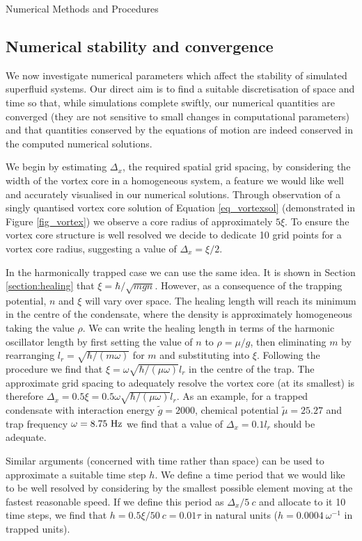 \begin{chapter}{\label{cha:numerics}Numerical Methods and Procedures}
\subsection{\label{section:numericalParams} Numerical stability and convergence}
	We now investigate numerical parameters which affect the stability of simulated superfluid systems. Our direct aim is to find a suitable discretisation of space and time so that, while simulations complete swiftly, our numerical quantities are converged (they are not sensitive to small changes in computational parameters) and that quantities conserved by the equations of motion are indeed conserved in the computed numerical solutions.

	We begin by estimating $\Delta_x$, the required spatial grid spacing, by considering the width of the vortex core in a homogeneous system, a feature we would like well and accurately visualised in our numerical solutions. Through observation of a singly quantised vortex core solution of Equation \ref{eq_vortexsol} (demonstrated in Figure \ref{fig_vortex}) we observe a core radius of approximately $5\xi$. To ensure the vortex core structure is well resolved we decide to dedicate 10 grid points for a vortex core radius, suggesting a value of $\Delta_x = \xi/2$.

	In the harmonically trapped case we can use the same idea. It is shown in Section \ref{section:healing} that $\xi = \hbar/\sqrt{mgn}$. However, as a consequence of the trapping potential, $n$ and $\xi$ will vary over space. The healing length will reach its minimum in the centre of the condensate, where the density is approximately homogeneous taking the value $\rho$. We can write the healing length in terms of the harmonic oscillator length by first setting the value of $n$ to $\rho = \mu/g$, then eliminating $m$ by rearranging $l_r = \sqrt{\hbar/(m\omega)}$ for $m$ and substituting into $\xi$. Following the procedure we find that $\xi = \omega\sqrt{\hbar/(\mu\omega)}l_r$ in the centre of the trap. The approximate grid spacing to adequately resolve the vortex core (at its smallest) is therefore $\Delta_x = 0.5\xi = 0.5\omega \sqrt{\hbar/(\mu \omega)} l_r$. As an example, for a trapped condensate with interaction energy $\tilde{g}=2000$, chemical potential $\tilde{\mu}=25.27$ and trap frequency $\omega=8.75~{\rm Hz}$ we find that a value of $\Delta_x=0.1l_r$ should be adequate.

	Similar arguments (concerned with time rather than space) can be used to approximate a suitable time step $h$. We define a time period that we would like to be well resolved by considering by the smallest possible element moving at the fastest reasonable speed. If we define this period as $\Delta_x / 5~c$ and allocate to it 10 time steps, we find that $h = 0.5\xi/50~c = 0.01\tau$ in natural units ($h=0.0004~\omega^{-1}$ in trapped units).


\end{chapter}
